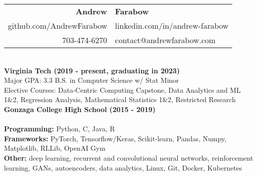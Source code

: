 \documentclass{article}
\begin{document}
\begin{center}
  \begin{tabular}{r l}
    {\huge\textbf{Andrew}}             & {\huge\textbf{Farabow}}        \\
    \hspace{35pt} github.com/AndrewFarabow & linkedin.com/in/andrew-farabow \\
    703-474-6270                       & contact@andrewfarabow.com      \\
  \end{tabular}


  \begin{flushleft}
    \begin{multicols}{2}
      {\large\textbf{\underline{}}} \\
      \textbf{Virginia Tech (2019 - present, graduating in 2023)} \\
      Major GPA: 3.3 \; B.S. in Computer Science w/ Stat Minor \\
      Elective Courses: Data-Centric Computing Capstone, Data Analytics and ML 1\&2, Regression Analysis, Mathematical Statistics 1\&2, Restricted Research \\
      \textbf{Gonzaga College High School	(2015 - 2019)} \\


      \columnbreak
      {\large\textbf{\underline{}}} \\
      {\textbf{Programming:}} Python, C, Java, R \\
      {\textbf{Frameworks:}} PyTorch, Tensorflow/Keras, Scikit-learn, Pandas, Numpy, Matplotlib, RLLib, OpenAI Gym \\
      {\textbf{Other:}} deep learning, recurrent and convolutional neural networks, reinforcement learning, GANs, autoencoders, data analytics, Linux, Git, Docker, Kubernetes \\ %

    \end{multicols}

    {\large\textbf{\underline{}}} \\



\end{flushleft}
\end{center}
\end{document}
